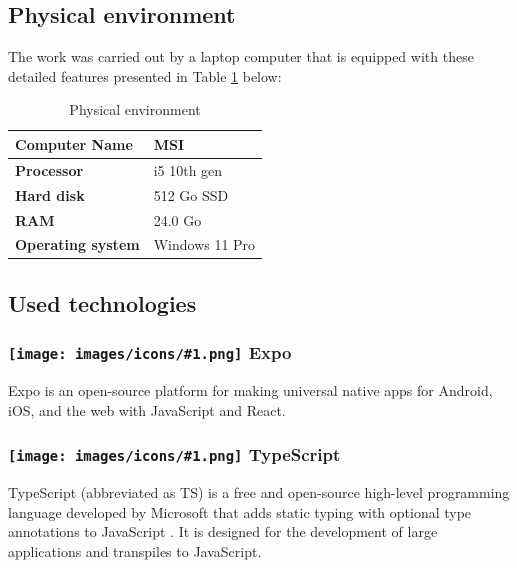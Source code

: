 \subsection{Physical environment}

The work was carried out by a laptop computer that is equipped with these detailed features presented in Table \ref{tab:physical-env} below:

\begin{table}[htbp]
    \centering
    \begin{tabular}{|l|l|}
        \hline
        \textbf{Computer Name} & MSI \\
        \hline
        \textbf{Processor} & i5 10th gen \\
        \hline
        \textbf{Hard disk} & 512 Go SSD \\
        \hline
        \textbf{RAM} & 24.0 Go \\
        \hline
        \textbf{Operating system} & Windows 11 Pro \\
        \hline
    \end{tabular}
    \caption{Physical environment}
    \label{tab:physical-env}
\end{table}

\subsection{Used technologies}

\newcommand{\techicon}[1]{%
  \texttt{[image: images/icons/\#1.png]}%
}

\subsubsection*{\protect\techicon{expo} Expo}

Expo is an open-source platform for making universal native apps for Android, iOS, and the web with JavaScript and React.

\subsubsection*{\protect\techicon{typescript} TypeScript}
                                                                
TypeScript (abbreviated as TS) is a free and open-source high-level programming language developed by Microsoft that adds static typing with optional type annotations to JavaScript \cite{TypeScriptDocs2023}. It is designed for the development of large applications and transpiles to JavaScript.

